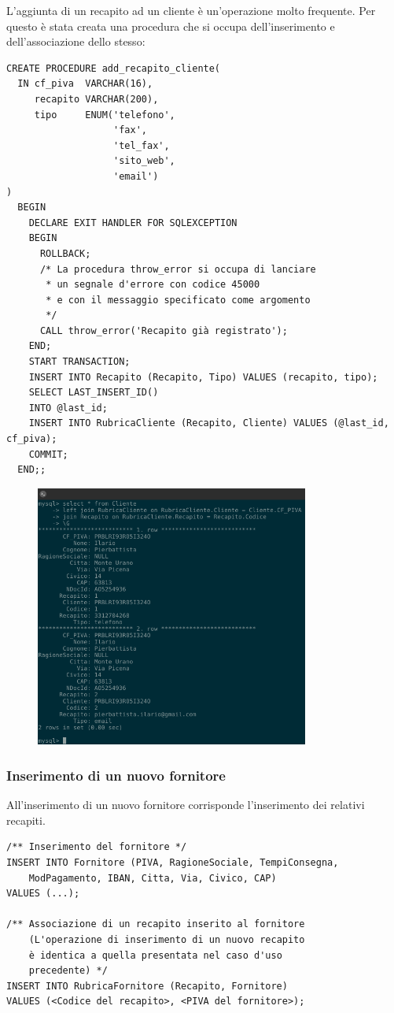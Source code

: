 			L'aggiunta di un recapito ad un cliente è un'operazione molto frequente. Per questo è stata creata una procedura che si occupa dell'inserimento e dell'associazione dello stesso:
				\begin{lstlisting}
CREATE PROCEDURE add_recapito_cliente(
  IN cf_piva  VARCHAR(16),
     recapito VARCHAR(200),
     tipo     ENUM('telefono',
                   'fax',
                   'tel_fax',
                   'sito_web',
                   'email')
)
  BEGIN
    DECLARE EXIT HANDLER FOR SQLEXCEPTION
    BEGIN
      ROLLBACK;
      /* La procedura throw_error si occupa di lanciare 
       * un segnale d'errore con codice 45000
       * e con il messaggio specificato come argomento
       */
      CALL throw_error('Recapito già registrato');
    END;
    START TRANSACTION;
    INSERT INTO Recapito (Recapito, Tipo) VALUES (recapito, tipo);
    SELECT LAST_INSERT_ID()
    INTO @last_id;
    INSERT INTO RubricaCliente (Recapito, Cliente) VALUES (@last_id, cf_piva);
    COMMIT;
  END;;
				\end{lstlisting}

        \begin{figure}[H]
          \centering
          \includegraphics[width=9cm]{images/screenshots/show_cliente_rubrica.png}
        \end{figure}


			\subsubsection{Inserimento di un nuovo fornitore}
				All'inserimento di un nuovo fornitore corrisponde l'inserimento dei relativi recapiti.
				\begin{lstlisting}
/** Inserimento del fornitore */
INSERT INTO Fornitore (PIVA, RagioneSociale, TempiConsegna,
	ModPagamento, IBAN, Citta, Via, Civico, CAP) 
VALUES (...);

/** Associazione di un recapito inserito al fornitore
	(L'operazione di inserimento di un nuovo recapito
	è identica a quella presentata nel caso d'uso 
	precedente) */
INSERT INTO RubricaFornitore (Recapito, Fornitore)
VALUES (<Codice del recapito>, <PIVA del fornitore>);
				\end{lstlisting}

